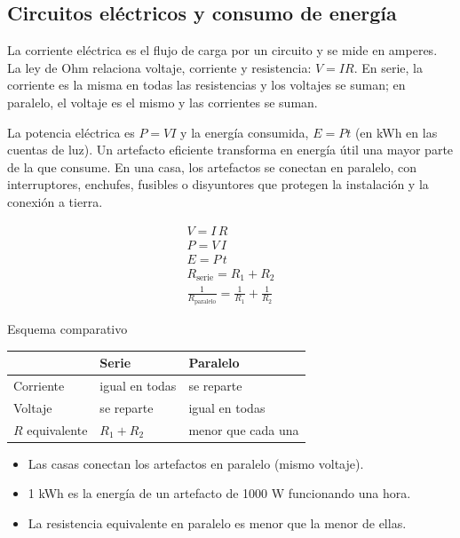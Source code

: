 \documentclass[10pt,a4paper,twocolumn]{article}
\begin{document}
\subsection{Circuitos eléctricos y consumo de energía}

La corriente eléctrica es el flujo de carga por un circuito y se mide en amperes. La ley de Ohm relaciona voltaje, corriente y resistencia: $V=IR$. En serie, la corriente es la misma en todas las resistencias y los voltajes se suman; en paralelo, el voltaje es el mismo y las corrientes se suman.

La potencia eléctrica es $P=VI$ y la energía consumida, $E=Pt$ (en kWh en las cuentas de luz). Un artefacto eficiente transforma en energía útil una mayor parte de la que consume. En una casa, los artefactos se conectan en paralelo, con interruptores, enchufes, fusibles o disyuntores que protegen la instalación y la conexión a tierra.

\begin{ley}[Fórmulas]
\begin{gather*}
V=I\,R \\
P=V\,I \\
E=P\,t \\
R_{\text{serie}}=R_1+R_2 \\
\frac{1}{R_{\text{paralelo}}}=\frac{1}{R_1}+\frac{1}{R_2}
\end{gather*}
\end{ley}

{\sffamily\footnotesize\color{zinc500} Esquema comparativo}
\begin{center}\small
\begin{tabular}{@{}>{\raggedright\arraybackslash}p{\dimexpr(\linewidth-4\tabcolsep)/3\relax}>{\raggedright\arraybackslash}p{\dimexpr(\linewidth-4\tabcolsep)/3\relax}>{\raggedright\arraybackslash}p{\dimexpr(\linewidth-4\tabcolsep)/3\relax}@{}}
\toprule
 & \textbf{Serie} & \textbf{Paralelo} \\
\midrule
Corriente & igual en todas & se reparte \\
Voltaje & se reparte & igual en todas \\
$R$ equivalente & $R_1+R_2$ & menor que cada una \\
\bottomrule
\end{tabular}
\end{center}

\begin{ideasclave}
\begin{itemize}
  \item Las casas conectan los artefactos en paralelo (mismo voltaje).
  \item 1 kWh es la energía de un artefacto de 1000 W funcionando una hora.
  \item La resistencia equivalente en paralelo es menor que la menor de ellas.
\end{itemize}
\end{ideasclave}
\end{document}
